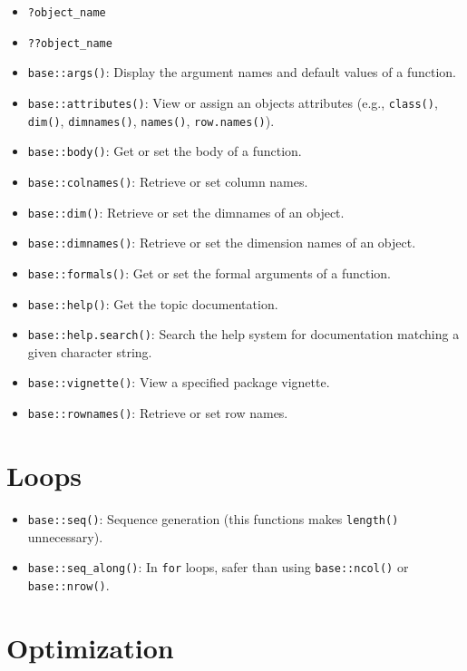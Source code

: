 \documentclass[
]{book}
\providecommand{\tightlist}{%
  \setlength{\itemsep}{0pt}\setlength{\parskip}{0pt}}
\begin{document}
\begin{itemize}
\tightlist
\item
  \texttt{?object\_name}
\item
  \texttt{??object\_name}
\item
  \texttt{base::args()}: Display the argument names and default values of a function.
\item
  \texttt{base::attributes()}: View or assign an objects attributes (e.g., \texttt{class()}, \texttt{dim()}, \texttt{dimnames()}, \texttt{names()}, \texttt{row.names()}).
\item
  \texttt{base::body()}: Get or set the body of a function.
\item
  \texttt{base::colnames()}: Retrieve or set column names.
\item
  \texttt{base::dim()}: Retrieve or set the dimnames of an object.
\item
  \texttt{base::dimnames()}: Retrieve or set the dimension names of an object.
\item
  \texttt{base::formals()}: Get or set the formal arguments of a function.
\item
  \texttt{base::help()}: Get the topic documentation.
\item
  \texttt{base::help.search()}: Search the help system for documentation matching a given character string.
\item
  \texttt{base::vignette()}: View a specified package vignette.
\item
  \texttt{base::rownames()}: Retrieve or set row names.
\end{itemize}

\hypertarget{loops}{%
\section{Loops}\label{loops}}

\begin{itemize}
\tightlist
\item
  \texttt{base::seq()}: Sequence generation (this functions makes \texttt{length()} unnecessary).
\item
  \texttt{base::seq\_along()}: In \texttt{for} loops, safer than using \texttt{base::ncol()} or \texttt{base::nrow()}.
\end{itemize}

\hypertarget{optimization}{%
\section{Optimization}\label{optimization}}
\end{document}
